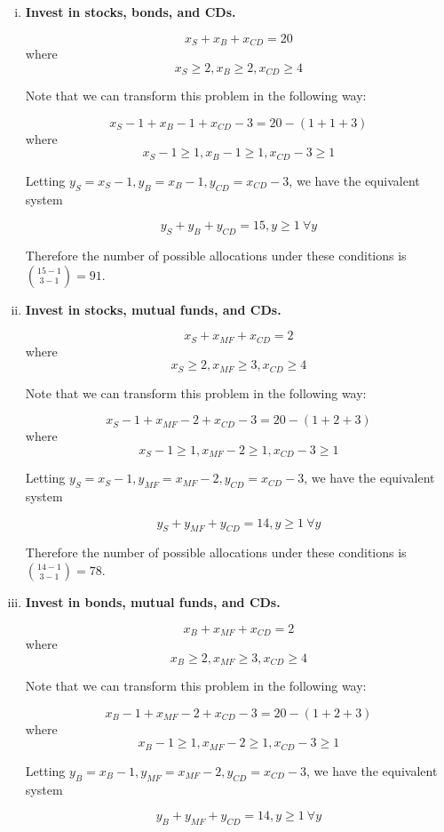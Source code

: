 \begin{enumerate}[(a)]
\begin{enumerate}[(i)]
\item \textbf{Invest in stocks, bonds, and CDs.}

\[
x_{S} + x_{B} + x_{CD} = 20\] where \[x_{S} \geq 2, x_{B} \geq 2, x_{CD} \geq 4
\]

Note that we can transform this problem in the following way:

\[
x_{S} - 1 +  x_{B} - 1 + x_{CD} - 3 = 20 -  (1 + 1 + 3)\] where \[ x_{S} - 1 \geq 1,  x_{B} - 1 \geq 1, x_{CD} - 3 \geq 1
\]

Letting \(y_{S} =  x_{S} - 1, y_{B} =  x_{B} - 1, y_{CD} =x_{CD} - 3  \), we have the equivalent system

\[
y_{S} + y_{B} + y_{CD} = 15, y \geq 1 \ \forall y
\]

Therefore the number of possible allocations under these conditions is \(\binom{15 - 1}{3 - 1} = \boxed{91} \).

\item \textbf{Invest in stocks, mutual funds, and CDs.}

\[
x_{S} + x_{MF} + x_{CD} = 2\] where \[x_{S} \geq 2, x_{MF} \geq 3,  x_{CD} \geq 4
\]

Note that we can transform this problem in the following way:

\[
x_{S} - 1 +  x_{MF} - 2 + x_{CD} - 3 = 20 -  (1 +  2 + 3)\] where \[ x_{S} - 1 \geq 1,  x_{MF} - 2 \geq 1,  x_{CD} - 3 \geq 1
\]

Letting \(y_{S} =  x_{S} - 1, y_{MF} = x_{MF} - 2, y_{CD} =x_{CD} - 3  \), we have the equivalent system

\[
y_{S} +y_{MF} + y_{CD} = 14, y \geq 1 \ \forall y
\]

Therefore the number of possible allocations under these conditions is \(\binom{14 - 1}{3 - 1} = \boxed{78} \).

\item \textbf{Invest in bonds, mutual funds, and CDs.}

\[
 x_{B} + x_{MF} + x_{CD} = 2\] where \[ x_{B} \geq 2, x_{MF} \geq 3,  x_{CD} \geq 4
\]

Note that we can transform this problem in the following way:

\[
 x_{B} - 1 + x_{MF} - 2 + x_{CD} - 3 = 20 -  ( 1 + 2 + 3)\] where \[  x_{B} - 1 \geq 1, x_{MF} - 2 \geq 1,  x_{CD} - 3 \geq 1
\]

Letting \( y_{B} =  x_{B} - 1, y_{MF} = x_{MF} - 2, y_{CD} =x_{CD} - 3  \), we have the equivalent system

\[
 y_{B} + y_{MF} + y_{CD} = 14, y \geq 1 \ \forall y
\]


\end{enumerate}
\end{enumerate}
